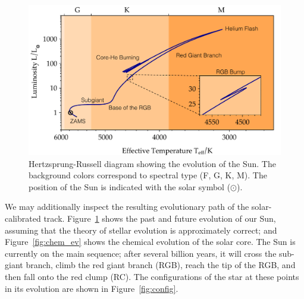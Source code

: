 \begin{figure}
    \includegraphics[width=\textwidth]{figs/evol/hr-solar.pdf}
    \caption[Solar H-R Diagram]{Hertzsprung-Russell diagram showing the evolution of the Sun. 
    The background colors correspond to spectral type (F, G, K, M). 
    The position of the Sun is indicated with the solar symbol ($\odot$). 
    \label{fig:solar-HR}}
\end{figure}


We may additionally inspect the resulting evolutionary path of the solar-calibrated track. 
Figure~\ref{fig:solar-HR} shows the past and future evolution of our Sun, assuming that the theory of stellar evolution is approximately correct; and Figure~\ref{fig:chem_ev} shows the chemical evolution of the solar core. 
The Sun is currently on the main sequence; after several billion years, it will cross the sub-giant branch, climb the red giant branch (RGB), reach the tip of the RGB, and then fall onto the red clump (RC). 
The configurations of the star at these points in its evolution are shown in Figure~\ref{fig:config}. 


